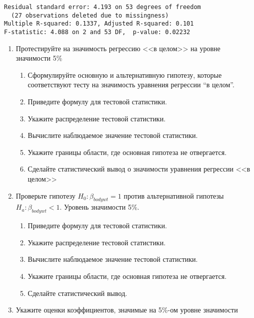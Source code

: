 \documentclass[pdftex,12pt,a4paper]{article}
\begin{document}
\begin{enumerate}
\begin{verbatim}
Residual standard error: 4.193 on 53 degrees of freedom
  (27 observations deleted due to missingness)
Multiple R-squared: 0.1337,	Adjusted R-squared: 0.101 
F-statistic: 4.088 on 2 and 53 DF,  p-value: 0.02232 
\end{verbatim}


\begin{enumerate}
\item  Протестируйте на значимость регрессию <<в целом>> на уровне значимости 5\%
\begin{enumerate}
\item Сформулируйте основную и альтернативную гипотезу, которые соответствуют тесту
на значимость уравнения регрессии “в целом”.
\here
\item Приведите формулу для тестовой статистики.
\here
\item Укажите распределение тестовой статистики.
\here
\item Вычислите наблюдаемое значение тестовой статистики.
\here
\item Укажите границы области, где основная гипотеза не отвергается.
\here
\item Сделайте статистический вывод о значимости уравнения регрессии <<в целом>>
\here
\end{enumerate} 
\item Проверьте гипотезу $H_0: \beta_{bodywt} = 1$ против альтернативной гипотезы $H_a: \beta_{bodywt} < 1$. Уровень значимости 5\%.
\begin{enumerate}
\item Приведите формулу для тестовой статистики.
\here
\item Укажите распределение тестовой статистики.
\here
\item Вычислите наблюдаемое значение тестовой статистики.
\here
\item Укажите границы области, где основная гипотеза не отвергается.
\here
\item Сделайте статистический вывод.
\here
\end{enumerate}
\item Укажите оценки коэффициентов, значимые на 5\%-ом уровне значимости
\here
\end{enumerate}


\end{enumerate}
\end{document}
